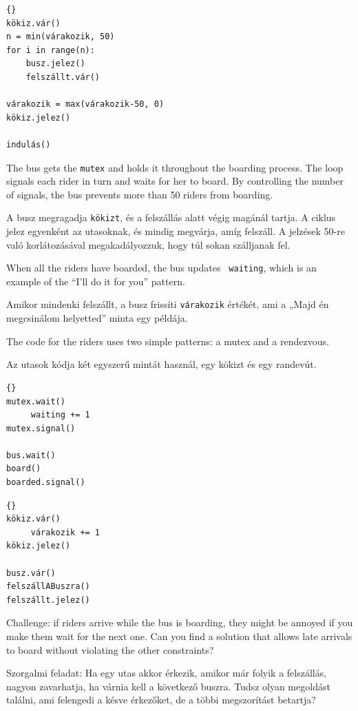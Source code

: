 \documentclass{book}
\begin{document}
\begin{lstlisting}[title={Egyetemi buszjárat megoldás \#2 (busz)}]{}
kökiz.vár()
n = min(várakozik, 50)
for i in range(n):
    busz.jelez()
    felszállt.vár()

várakozik = max(várakozik-50, 0)
kökiz.jelez()

indulás()
\end{lstlisting}

The bus gets the {\tt mutex} and holds it throughout the boarding
process.  The loop signals each rider in turn and waits for her to
board.  By controlling the number of signals, the bus prevents
more than 50 riders from boarding.

A busz megragadja {\tt kökizt}, és a felszállás alatt végig magánál
tartja. A ciklus jelez egyenként az utasoknak, és mindig megvárja,
amíg felszáll. A jelzések 50-re való korlátozásával megakadályozzuk,
hogy túl sokan szálljanak fel.

When all the riders have boarded, the bus updates {\tt
waiting}, which is an example of the ``I'll do it for you'' pattern.

Amikor mindenki felszállt, a busz frissíti {\tt várakozik} értékét,
ami a „Majd én megcsinálom helyetted” minta egy példája.

The code for the riders uses two
simple patterns: a mutex and a rendezvous.

Az utasok kódja két egyszerű mintát használ, egy kökizt és
egy randevút.

\begin{lstlisting}[title={Bus problem solution (riders)}]{}
mutex.wait()
     waiting += 1
mutex.signal()

bus.wait()
board()
boarded.signal()
\end{lstlisting}

\begin{lstlisting}[title={Egyetemi buszjárat megoldás \#2 (utasok)}]{}
kökiz.vár()
     várakozik += 1
kökiz.jelez()

busz.vár()
felszállABuszra()
felszállt.jelez()
\end{lstlisting}

Challenge: if riders arrive while the bus is boarding, they
might be annoyed if you make them wait for the next one.  Can you
find a solution that allows late arrivals to board without violating
the other constraints?

Szorgalmi feladat: Ha egy utas akkor érkezik, amikor már folyik
a felszállás, nagyon zavarhatja, ha várnia kell a következő
buszra. Tudsz olyan megoldást találni, ami felengedi a késve
érkezőket, de a többi megszorítást betartja? 
\end{document}
